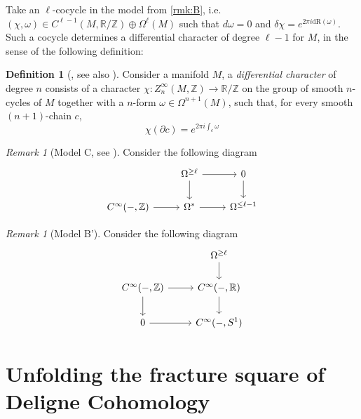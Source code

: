 \documentclass[10pt]{amsart}
\newcommand{\bR}{\mathbb{R}}
\newcommand{\bZ}{\mathbb{Z}}
\newcommand{\dr}{\mathrm{dR}}
\theoremstyle{definition}
\newtheorem{definition}[equation]{Definition}
\theoremstyle{remark}
\newtheorem{remark}[equation]{Remark}
\numberwithin{equation}{section}
\begin{document}
Take an $\ell$-cocycle in the model from \cref{rmk:B}, i.e. $(\chi,\omega)\in C^{\ell-1}(M,\bR/\bZ)\oplus\Omega^{\ell}(M)$ such that $d\omega=0$ and $\delta\chi=e^{2\pi i\dr(\omega)}$. Such a cocycle determines a differential character of degree $\ell-1$ for $M$, in the sense of the following definition:
\begin{definition}[{\cite[Definition 3.4]{hopkinssinger2005diffcoh}}, see also {\cite[Chapter 5]{barbecker2014diffchar}}] Consider a manifold $M$, a \emph{differential character} of degree $n$ consists of a character $\chi:Z^\infty_{n}(M,\bZ)\to\bR/\bZ$ on the group of smooth $n$-cycles of $M$ together with a $n$-form $\omega\in\Omega^{n+1}(M)$, such that, for every smooth $(n+1)$-chain $c$, \[\chi(\partial c)=e^{2\pi i\int_c\omega}\]
\end{definition}

\begin{remark}[Model C, see {\cite[Lemma 7.3.4]{amabeldebrayhaine2021diffcoh}}] Consider the following diagram  
  \[\begin{tikzcd}
     & \Omega^{\geq \ell}\arrow[d] \arrow[r] & 0\arrow[d] \\
    C^{\infty}(-,\bZ) \arrow[r] & \Omega^*\arrow[r] & \Omega^{\leq\ell-1}
  \end{tikzcd}\]
\end{remark}
\begin{remark}[Model B'] Consider the following diagram 
  \[\begin{tikzcd}
     & \Omega^{\geq \ell}\arrow[d] \\
    C^\infty(-,\bZ) \arrow[d]\arrow[r] & C^\infty(-,\bR)\arrow[d] \\ 
    0\arrow[r] & C^\infty(-,S^1)
  \end{tikzcd}\]
\end{remark}


\section{Unfolding the fracture square of Deligne Cohomology}

{\footnotesize


}
\end{document}
